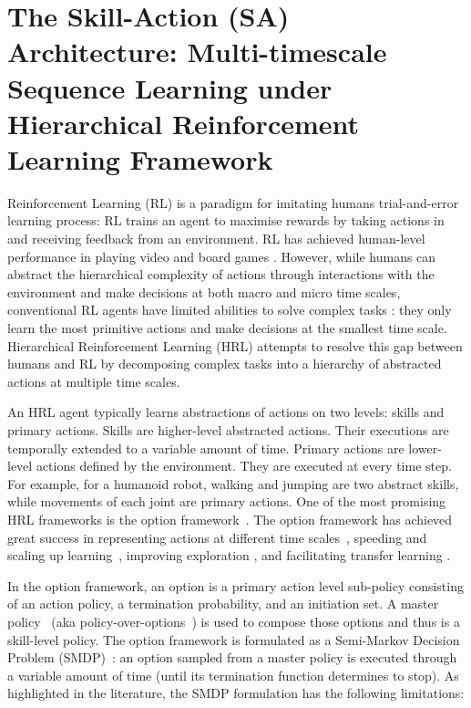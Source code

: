 
\chapter{The Skill-Action (SA) Architecture: Multi-timescale
  Sequence Learning under Hierarchical Reinforcement Learning
  Framework}
\label{cha:sa_app}


Reinforcement Learning (RL) is a paradigm for imitating humans
trial-and-error learning process: RL trains an agent to maximise
rewards by taking actions in and receiving feedback from an
environment. RL has achieved human-level performance in playing
video and board games \cite{mnih2015human,silver2016mastering}.
However, while humans can abstract the hierarchical complexity of
actions through interactions with the environment and make
decisions at both macro and micro time scales, conventional RL
agents have limited abilities to solve complex tasks
\cite{daniel2016probabilistic}: they only learn the most
primitive actions and make decisions at the smallest time scale.
Hierarchical Reinforcement Learning (HRL) attempts to resolve
this gap between humans and RL by decomposing complex tasks into
a hierarchy of abstracted actions at multiple time scales.

An HRL agent typically learns abstractions of actions on two
levels: skills and primary actions. Skills are higher-level
abstracted actions. Their executions are temporally extended to a
variable amount of time. Primary actions are lower-level actions
defined by the environment. They are executed at every time step.
For example, for a humanoid robot, walking and jumping are two
abstract skills, while movements of each joint are primary
actions. One of the most promising HRL frameworks is the option
framework~\cite{sutton1999between}. The option framework has
achieved great success in representing actions at different time
scales~\cite{bacon2017option}, speeding and scaling up
learning~\cite{bacon2018temporal}, improving exploration
\cite{harb2018waiting}, and facilitating transfer learning
\cite{zhang2019dac}.

In the option framework, an option is a primary action level
sub-policy consisting of an action policy, a termination
probability, and an initiation set. A master
policy~\cite{zhang2019dac} (aka
policy-over-options~\cite{sutton1999between}) is used to compose
those options and thus is a skill-level policy. The option
framework is formulated as a Semi-Markov Decision Problem
(SMDP)~\cite{puterman2014markov}: an option sampled from a master
policy is executed through a variable amount of time (until its
termination function determines to stop). As highlighted in the
literature, the SMDP formulation has the following limitations:

